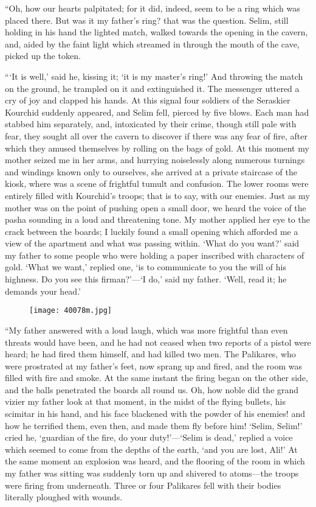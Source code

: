 “Oh, how our hearts palpitated; for it did, indeed, seem to be a ring
which was placed there. But was it my father’s ring? that was the
question. Selim, still holding in his hand the lighted match, walked
towards the opening in the cavern, and, aided by the faint light which
streamed in through the mouth of the cave, picked up the token.

“‘It is well,’ said he, kissing it; ‘it is my master’s ring!’ And
throwing the match on the ground, he trampled on it and extinguished
it. The messenger uttered a cry of joy and clapped his hands. At this
signal four soldiers of the Seraskier Kourchid suddenly appeared, and
Selim fell, pierced by five blows. Each man had stabbed him separately,
and, intoxicated by their crime, though still pale with fear, they
sought all over the cavern to discover if there was any fear of fire,
after which they amused themselves by rolling on the bags of gold. At
this moment my mother seized me in her arms, and hurrying noiselessly
along numerous turnings and windings known only to ourselves, she
arrived at a private staircase of the kiosk, where was a scene of
frightful tumult and confusion. The lower rooms were entirely filled
with Kourchid’s troops; that is to say, with our enemies. Just as my
mother was on the point of pushing open a small door, we heard the
voice of the pasha sounding in a loud and threatening tone. My mother
applied her eye to the crack between the boards; I luckily found a
small opening which afforded me a view of the apartment and what was
passing within. ‘What do you want?’ said my father to some people who
were holding a paper inscribed with characters of gold. ‘What we want,’
replied one, ‘is to communicate to you the will of his highness. Do you
see this firman?’—‘I do,’ said my father. ‘Well, read it; he demands
your head.’

\begin{figure}[ht]
\texttt{[image: 40078m.jpg]}
\end{figure}

“My father answered with a loud laugh, which was more frightful than
even threats would have been, and he had not ceased when two reports of
a pistol were heard; he had fired them himself, and had killed two men.
The Palikares, who were prostrated at my father’s feet, now sprang up
and fired, and the room was filled with fire and smoke. At the same
instant the firing began on the other side, and the balls penetrated
the boards all round us. Oh, how noble did the grand vizier my father
look at that moment, in the midst of the flying bullets, his scimitar
in his hand, and his face blackened with the powder of his enemies! and
how he terrified them, even then, and made them fly before him! ‘Selim,
Selim!’ cried he, ‘guardian of the fire, do your duty!’—‘Selim is
dead,’ replied a voice which seemed to come from the depths of the
earth, ‘and you are lost, Ali!’ At the same moment an explosion was
heard, and the flooring of the room in which my father was sitting was
suddenly torn up and shivered to atoms—the troops were firing from
underneath. Three or four Palikares fell with their bodies literally
ploughed with wounds.

